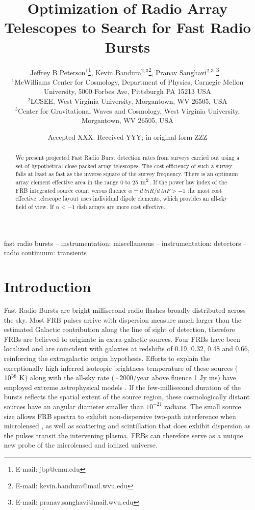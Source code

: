\documentclass[fleqn,usenatbib]{mnras}
\title{Optimization of Radio Array Telescopes to Search for Fast Radio Bursts}
\author[Peterson J. B. et. al.]{
Jeffrey B Peterson$^{1}$\thanks{E-mail: jbp@cmu.edu },
Kevin Bandura$^{2,3}$\thanks{E-mail: kevin.bandura@mail.wvu.edu },
Pranav Sanghavi$^{2,3}$ \thanks{E-mail: pranav.sanghavi@mail.wvu.edu}
\
\\
$^{1}$McWilliams Center for Cosmology, Department of Physics, Carnegie Mellon University, 5000 Forbes Ave, Pittsburgh PA 15213 USA\\
$^{2}$LCSEE, West Virginia University, Morgantown, WV 26505, USA\\
$^{3}$Center for Gravitational Waves and Cosmology, West Virginia University, Morgantown, WV 26505, USA
}
\date{Accepted XXX. Received YYY; in original form ZZZ}
\begin{document}
\label{firstpage}
\pagerange{\pageref{firstpage}--\pageref{lastpage}}
\maketitle

\begin{abstract}
We present projected Fast Radio Burst detection rates from surveys carried out using a set of hypothetical close-packed array telescopes. The cost efficiency of such a survey falls at least as fast as the inverse square of the survey frequency. There is an optimum array element effective area in the range 0 to 25 $\rm{m^2}$.  If the power law index of the FRB integrated source count versus fluence $\alpha = d ~ln R/d ~ln F > -1$ the most cost effective telescope layout uses individual dipole elements, which provides an all-sky field of view. If $\alpha <-1$ dish arrays are more cost effective.

\end{abstract}

\begin{keywords}
fast radio bursts -- instrumentation: miscellaneous -- instrumentation: detectors -- radio continuum: transients 
\end{keywords}

\section{Introduction}
Fast Radio Bursts are bright millisecond radio flashes broadly distributed across the sky. Most FRB pulses arrive with dispersion measure much larger than the estimated Galactic contribution along the line of sight of detection, therefore FRBs are believed to originate in extra-galactic sources.
Four FRBs \citep{2017ApJ...834L...7T,frbcat} have been localized and are coincident with galaxies at redshifts of 0.19, 0.32, 0.48 and 0.66, reinforcing the extragalactic origin hypothesis.
Efforts to explain the exceptionally high inferred isotropic brightness temperature of these sources ($10^{38} \rm{~K}$) along with the all-sky rate ($\sim$2000/year above fluence 1 Jy ms) have employed extreme astrophysical models \citep{review1, review2}. If the few-millisecond duration of the bursts reflects the spatial extent of the source region, these cosmologically distant sources have an angular diameter smaller than $10^{-21}$ radians. The small source size allows FRB spectra to exhibit non-dispersive two-path interference when microlensed \citep{2019BAAS...51c.420R}, as well as scattering and scintillation that does exhibit dispersion as the pulses transit the intervening plasma. FRBs can therefore serve as a unique new probe of the microlensed and ionized universe.
\end{document}
